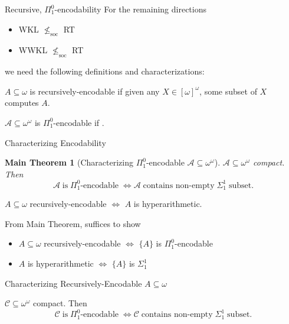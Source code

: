 \begin{frame}{Recursive, $\Pi_1^0$-encodability}
  For the remaining directions
  \begin{itemize}
    \item WKL $\nleq_{\text{soc}}$ RT
    \item WWKL $\nleq_{\text{soc}}$ RT
  \end{itemize}

  we need the following definitions and characterizations:
  \vspace{1em}

  \begin{define}
    $A\subseteq\omega$ is recursively-encodable if given any
    $X\in[\omega]^\omega$, some subset of $X$ computes $A$.
  \end{define}

  \begin{define}[$\Pi_1^0$-encodability]
    $\mathcal{A}\subseteq \omega^{\omega}$ is $\Pi_1^0$-encodable if
    .
  \end{define}
\end{frame}

\begin{frame}{Characterizing Encodability}
  \newtheorem*{main-thm*}{Main Theorem}
  \begin{main-thm*}[Characterizing $\Pi_1^0$-encodable
  $\mathcal{A}\subseteq\omega^\omega$]
    $\mathcal{A}\subseteq \omega^{\omega}$ compact. Then
    \[\mathcal{A}\; \text{is}\; \Pi_1^0\text{-encodable}\; \Leftrightarrow
    \mathcal{A}\; \text{contains non-empty}\; \Sigma_1^1\; \text{subset}.\]
  \end{main-thm*}

  \begin{coro*}
    $A\subseteq\omega$ recursively-encodable $\Leftrightarrow$ $A$ is
    hyperarithmetic.
  \end{coro*}

  \vspace{1em}
  From Main Theorem, suffices to show
  \begin{itemize}
    \item $A\subseteq\omega$ recursively-encodable $\Leftrightarrow$
      $\{A\}$ is $\Pi_1^0$-encodable
    \item $A$ is hyperarithmetic $\Leftrightarrow$ $\{A\}$ is $\Sigma_1^1$
  \end{itemize}
\end{frame}

\begin{frame}{Characterizing Recursively-Encodable $A\subseteq\omega$}
  \begin{thm}
    $\mathcal{C}\subseteq \omega^{\omega}$ compact. Then
    \[\mathcal{C}\; \text{is}\; \Pi_1^0\text{-encodable}\; \Leftrightarrow
    \mathcal{C}\; \text{contains non-empty}\; \Sigma_1^1\; \text{subset}.\]
  \end{thm}
\end{frame}
